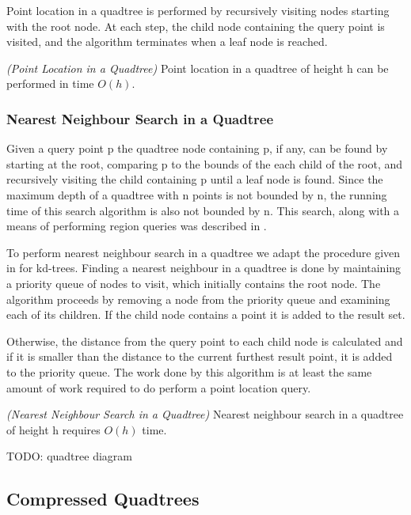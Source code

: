\documentclass[mcs]{scsthesis}
\begin{document}
Point location in a quadtree is performed by recursively visiting nodes
starting with the root node. At each step, the child node containing the query
point is visited, and the algorithm terminates when a leaf node is reached.

\begin{thm} \emph{(Point Location in a Quadtree)} 
Point location in a quadtree of height h can be performed in time \(O(h)\). 
\end{thm}

\subsubsection{Nearest Neighbour Search in a Quadtree}

Given a query point p the quadtree node containing p, if any, can be found by
starting at the root, comparing p to the bounds of the each child of the root,
and recursively visiting the child containing p until a leaf node is found.  
Since the maximum depth of a quadtree with n points is not bounded by n, the
running time of this search algorithm is also not bounded by n. This search,
along with a means of performing region queries was described in
\cite{quadtree}.

To perform nearest neighbour search in a quadtree we adapt the procedure given
in \cite{samet} for kd-trees. Finding a nearest neighbour in a quadtree is done
by maintaining a priority queue of nodes to visit, which initially contains the
root node. The algorithm proceeds by removing a node from the priority queue and
examining each of its children. If the child node contains a point it is added
to the result set.

Otherwise, the distance from the query point to each child node is calculated
and if it is smaller than the distance to the current furthest result point,
it is added to the priority queue. The work done by this algorithm is at
least the same amount of work required to do perform a point location query.

\begin{thm} \emph{(Nearest Neighbour Search in a Quadtree)} 
Nearest neighbour search in a quadtree of height h requires \(O(h)\) time.
\end{thm}

TODO: quadtree diagram

\subsection{Compressed Quadtrees}
\end{document}
